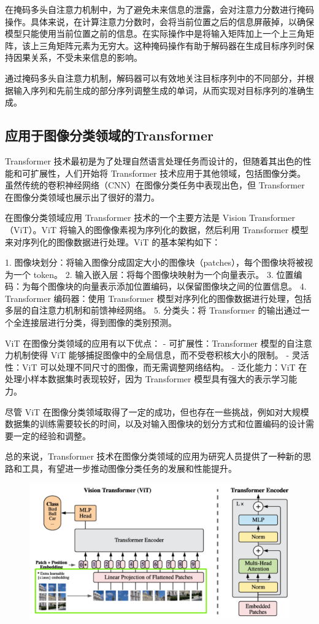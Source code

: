 在掩码多头自注意力机制中，为了避免未来信息的泄露，会对注意力分数进行掩码操作。具体来说，在计算注意力分数时，会将当前位置之后的信息屏蔽掉，以确保模型只能使用当前位置之前的信息。在实际操作中是将输入矩阵加上一个上三角矩阵，该上三角矩阵元素为无穷大。这种掩码操作有助于解码器在生成目标序列时保持因果关系，不受未来信息的影响。

通过掩码多头自注意力机制，解码器可以有效地关注目标序列中的不同部分，并根据输入序列和先前生成的部分序列调整生成的单词，从而实现对目标序列的准确生成。
\subsection{应用于图像分类领域的Transformer}
Transformer 技术最初是为了处理自然语言处理任务而设计的，但随着其出色的性能和可扩展性，人们开始将 Transformer 技术应用于其他领域，包括图像分类。虽然传统的卷积神经网络（CNN）在图像分类任务中表现出色，但 Transformer 在图像分类领域也展示出了很好的潜力。

在图像分类领域应用 Transformer 技术的一个主要方法是 Vision Transformer（ViT）。ViT 将输入的图像像素视为序列化的数据，然后利用 Transformer 模型来对序列化的图像数据进行处理。ViT 的基本架构如下：

1. 图像块划分：将输入图像分成固定大小的图像块（patches），每个图像块将被视为一个 token。
2. 输入嵌入层：将每个图像块映射为一个向量表示。
3. 位置编码：为每个图像块的向量表示添加位置编码，以保留图像块之间的位置信息。
4. Transformer 编码器：使用 Transformer 模型对序列化的图像数据进行处理，包括多层的自注意力机制和前馈神经网络。
5. 分类头：将 Transformer 的输出通过一个全连接层进行分类，得到图像的类别预测。

ViT 在图像分类领域的应用有以下优点：
- 可扩展性：Transformer 模型的自注意力机制使得 ViT 能够捕捉图像中的全局信息，而不受卷积核大小的限制。
- 灵活性：ViT 可以处理不同尺寸的图像，而无需调整网络结构。
- 泛化能力：ViT 在处理小样本数据集时表现较好，因为 Transformer 模型具有强大的表示学习能力。

尽管 ViT 在图像分类领域取得了一定的成功，但也存在一些挑战，例如对大规模数据集的训练需要较长的时间，以及对输入图像块的划分方式和位置编码的设计需要一定的经验和调整。

总的来说，Transformer 技术在图像分类领域的应用为研究人员提供了一种新的思路和工具，有望进一步推动图像分类任务的发展和性能提升。
\begin{figure}[h]
	\centering 
	\includegraphics[width=12cm]{fig/ch2/vit2.png}
	\label{fig:vit2}
\end{figure}
